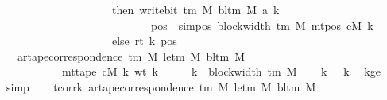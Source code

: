 \begin{isabellebody}
\ \ \ \ \ \ \ \ \ \ \ \ \ \ \ \ \ \ \ \ then\ write{\isacharunderscore}{\kern0pt}bit\ {\isacharparenleft}{\kern0pt}{\isasymGamma}{\isacharunderscore}{\kern0pt}tm\ M{\isacharparenright}{\kern0pt}\ {\isacharparenleft}{\kern0pt}bl{\isacharunderscore}{\kern0pt}tm\ M{\isacharparenright}{\kern0pt}\ {\isacharparenleft}{\kern0pt}a{\isacharprime}{\kern0pt}\ k{\isacharparenright}{\kern0pt}\isanewline
\ \ \ \ \ \ \ \ \ \ \ \ \ \ \ \ \ \ \ \ \ \ \ \ \ \ \ {\isacharparenleft}{\kern0pt}pos\ {\isacharminus}{\kern0pt}\ sim{\isacharunderscore}{\kern0pt}pos\ {\isacharparenleft}{\kern0pt}block{\isacharunderscore}{\kern0pt}width\ {\isacharparenleft}{\kern0pt}{\isasymGamma}{\isacharunderscore}{\kern0pt}tm\ M{\isacharparenright}{\kern0pt}{\isacharparenright}{\kern0pt}\ {\isacharparenleft}{\kern0pt}mt{\isacharunderscore}{\kern0pt}pos\ cM\ k{\isacharparenright}{\kern0pt}{\isacharparenright}{\kern0pt}\isanewline
\ \ \ \ \ \ \ \ \ \ \ \ \ \ \ \ \ \ \ \ else\ rt\ k\ pos{\isacharparenright}{\kern0pt}{\isachardoublequoteclose}\isanewline
\ \ \ {\isachardoublequoteopen}ar{\isacharunderscore}{\kern0pt}tape{\isacharunderscore}{\kern0pt}correspondence\ {\isacharparenleft}{\kern0pt}{\isasymGamma}{\isacharunderscore}{\kern0pt}tm\ M{\isacharparenright}{\kern0pt}\ {\isacharparenleft}{\kern0pt}le{\isacharunderscore}{\kern0pt}tm\ M{\isacharparenright}{\kern0pt}\ {\isacharparenleft}{\kern0pt}bl{\isacharunderscore}{\kern0pt}tm\ M{\isacharparenright}{\kern0pt}\isanewline
\ \ \ \ \ \ \ \ \ \ \ {\isacharparenleft}{\kern0pt}mt{\isacharunderscore}{\kern0pt}tape\ cM{\isacharunderscore}{\kern0pt}{}\ k{\isacharparenright}{\kern0pt}\ {\isacharparenleft}{\kern0pt}wt\ k{\isacharparenright}{\kern0pt}{\isachardoublequoteclose}\isanewline
%
\isadelimproof
%
\endisadelimproof
%
\isatagproof
{}\isamarkupfalse%
\ {\isacharminus}{\kern0pt}\isanewline
\ \ \isamarkupfalse%
\ {\isacharquery}{\kern0pt}k\ {\isacharequal}{\kern0pt}\ {\isachardoublequoteopen}block{\isacharunderscore}{\kern0pt}width\ {\isacharparenleft}{\kern0pt}{\isasymGamma}{\isacharunderscore}{\kern0pt}tm\ M{\isacharparenright}{\kern0pt}{\isachardoublequoteclose}\isanewline
\ \ \isamarkupfalse%
\ k{}{\isacharcolon}{\kern0pt}\ {\isachardoublequoteopen}{}\ {\isasymle}\ {\isacharquery}{\kern0pt}k{\isachardoublequoteclose}\ \isamarkupfalse%
\ kge{}\ \isamarkupfalse%
\ simp\isanewline
\ \ \isamarkupfalse%
\ tcorr{\isacharunderscore}{\kern0pt}k{\isacharcolon}{\kern0pt}\ {\isachardoublequoteopen}ar{\isacharunderscore}{\kern0pt}tape{\isacharunderscore}{\kern0pt}correspondence\ {\isacharparenleft}{\kern0pt}{\isasymGamma}{\isacharunderscore}{\kern0pt}tm\ M{\isacharparenright}{\kern0pt}\ {\isacharparenleft}{\kern0pt}le{\isacharunderscore}{\kern0pt}tm\ M{\isacharparenright}{\kern0pt}\ {\isacharparenleft}{\kern0pt}bl{\isacharunderscore}{\kern0pt}tm\ M{\isacharparenright}{\kern0pt}\isanewline

\end{isabellebody}
